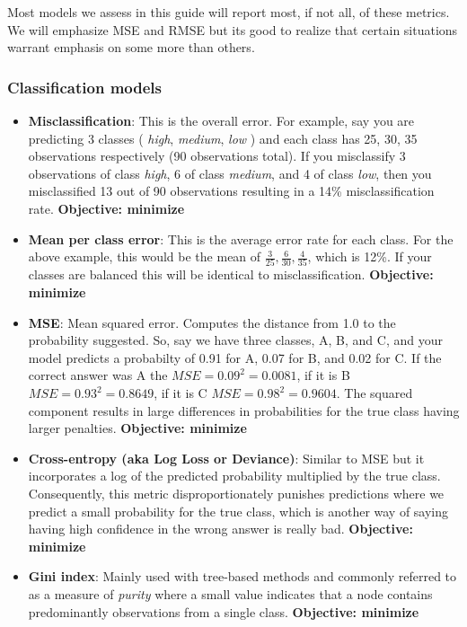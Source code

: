 \documentclass[]{book}
\theoremstyle{definition}
\theoremstyle{definition}
\theoremstyle{definition}
\theoremstyle{remark}
\begin{document}
Most models we assess in this guide will report most, if not all, of
these metrics. We will emphasize MSE and RMSE but its good to realize
that certain situations warrant emphasis on some more than others.

\hypertarget{classification-models}{%
\subsubsection{Classification models}\label{classification-models}}

\begin{itemize}
\item
  \textbf{Misclassification}: This is the overall error. For example,
  say you are predicting 3 classes ( \emph{high}, \emph{medium},
  \emph{low} ) and each class has 25, 30, 35 observations respectively
  (90 observations total). If you misclassify 3 observations of class
  \emph{high}, 6 of class \emph{medium}, and 4 of class \emph{low}, then
  you misclassified 13 out of 90 observations resulting in a 14\%
  misclassification rate. \textbf{Objective: minimize}
\item
  \textbf{Mean per class error}: This is the average error rate for each
  class. For the above example, this would be the mean of
  \(\frac{3}{25}, \frac{6}{30}, \frac{4}{35}\), which is 12\%. If your
  classes are balanced this will be identical to misclassification.
  \textbf{Objective: minimize}
\item
  \textbf{MSE}: Mean squared error. Computes the distance from 1.0 to
  the probability suggested. So, say we have three classes, A, B, and C,
  and your model predicts a probabilty of 0.91 for A, 0.07 for B, and
  0.02 for C. If the correct answer was A the \(MSE = 0.09^2 = 0.0081\),
  if it is B \(MSE = 0.93^2 = 0.8649\), if it is C
  \(MSE = 0.98^2 = 0.9604\). The squared component results in large
  differences in probabilities for the true class having larger
  penalties. \textbf{Objective: minimize}
\item
  \textbf{Cross-entropy (aka Log Loss or Deviance)}: Similar to MSE but
  it incorporates a log of the predicted probability multiplied by the
  true class. Consequently, this metric disproportionately punishes
  predictions where we predict a small probability for the true class,
  which is another way of saying having high confidence in the wrong
  answer is really bad. \textbf{Objective: minimize}
\item
  \textbf{Gini index}: Mainly used with tree-based methods and commonly
  referred to as a measure of \emph{purity} where a small value
  indicates that a node contains predominantly observations from a
  single class. \textbf{Objective: minimize}
\end{itemize}
\end{document}
